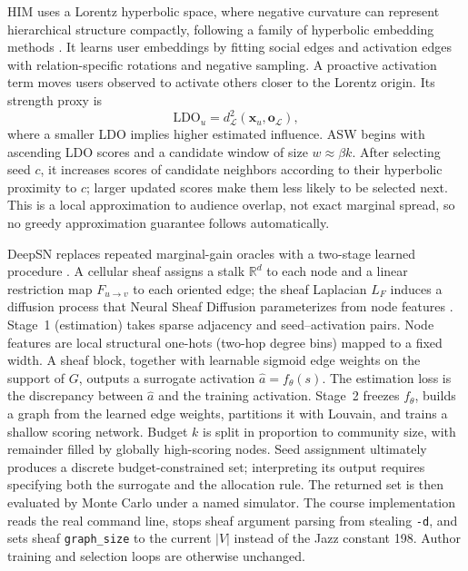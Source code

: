 \documentclass[10pt,twocolumn]{article}
\begin{document}
HIM uses a Lorentz hyperbolic space, where negative curvature can represent hierarchical structure compactly, following a family of hyperbolic embedding methods \cite{poincare}. It learns user embeddings by fitting social edges and activation edges with relation-specific rotations and negative sampling. A proactive activation term moves users observed to activate others closer to the Lorentz origin. Its strength proxy is
\begin{equation}
\mathrm{LDO}_u=d_{\mathcal L}^{2}(\mathbf{x}_u,\mathbf{o}_{\mathcal L}),
\end{equation}
where a smaller LDO implies higher estimated influence.
ASW begins with ascending LDO scores and a candidate window of size $w\approx\beta k$. After selecting seed $c$, it increases scores of candidate neighbors according to their hyperbolic proximity to $c$; larger updated scores make them less likely to be selected next. This is a local approximation to audience overlap, not exact marginal spread, so no greedy approximation guarantee follows automatically.

DeepSN replaces repeated marginal-gain oracles with a two-stage learned procedure \cite{deepsn}. A cellular sheaf assigns a stalk $\mathbb{R}^{d}$ to each node and a linear restriction map $F_{u\to v}$ to each oriented edge; the sheaf Laplacian $L_{F}$ induces a diffusion process that Neural Sheaf Diffusion parameterizes from node features \cite{hansen,bodnar}. Stage~1 (estimation) takes sparse adjacency and seed--activation pairs. Node features are local structural one-hots (two-hop degree bins) mapped to a fixed width. A sheaf block, together with learnable sigmoid edge weights on the support of $G$, outputs a surrogate activation $\hat a=f_{\theta}(s)$. The estimation loss is the discrepancy between $\hat a$ and the training activation. Stage~2 freezes $f_{\theta}$, builds a graph from the learned edge weights, partitions it with Louvain, and trains a shallow scoring network. Budget $k$ is split in proportion to community size, with remainder filled by globally high-scoring nodes. Seed assignment ultimately produces a discrete budget-constrained set; interpreting its output requires specifying both the surrogate and the allocation rule. The returned set is then evaluated by Monte Carlo under a named simulator. The course implementation reads the real command line, stops sheaf argument parsing from stealing \texttt{-d}, and sets sheaf \texttt{graph\_size} to the current $|V|$ instead of the Jazz constant 198. Author training and selection loops are otherwise unchanged.
\end{document}

